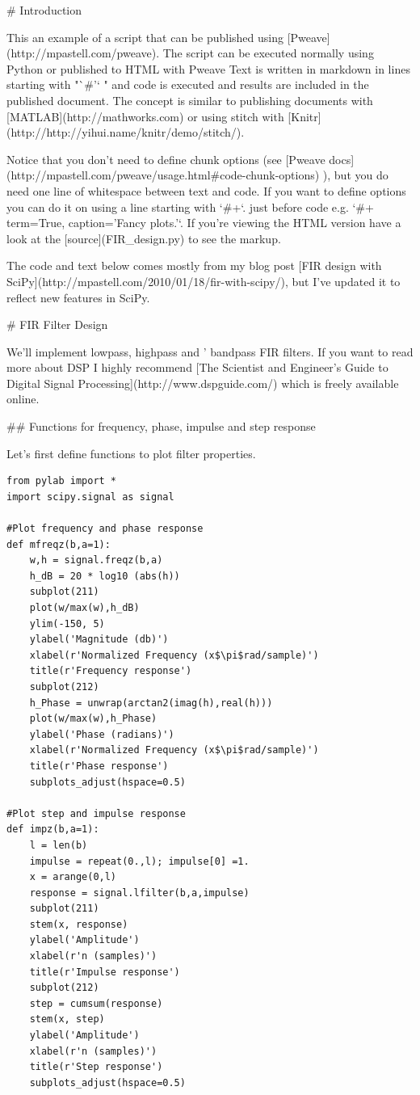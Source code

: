 
# Introduction

This an example of a script that can be published using
[Pweave](http://mpastell.com/pweave). The script can be executed
normally using Python or published to HTML with Pweave
Text is written in markdown in lines starting with "`#'` " and code
is executed and results are included in the published document.
The concept is similar to
publishing documents with [MATLAB](http://mathworks.com) or using
stitch with [Knitr](http://http://yihui.name/knitr/demo/stitch/).

Notice that you don't need to define chunk options (see
[Pweave docs](http://mpastell.com/pweave/usage.html#code-chunk-options)
),
but you do need one line of whitespace between text and code.
If you want to define options you can do it on using a line starting with
`#+`. just before code e.g. `#+ term=True, caption='Fancy plots.'`. 
If you're viewing the HTML version have a look at the
[source](FIR_design.py) to see the markup.

The code and text below comes mostly
from my blog post [FIR design with SciPy](http://mpastell.com/2010/01/18/fir-with-scipy/),
but I've updated it to reflect new features in SciPy. 

# FIR Filter Design

We'll implement lowpass, highpass and ' bandpass FIR filters. If
you want to read more about DSP I highly recommend [The Scientist
and Engineer's Guide to Digital Signal
Processing](http://www.dspguide.com/) which is freely available
online.

## Functions for frequency, phase, impulse and step response

Let's first define functions to plot filter
properties.



\begin{verbatim}
from pylab import *
import scipy.signal as signal

#Plot frequency and phase response
def mfreqz(b,a=1):
    w,h = signal.freqz(b,a)
    h_dB = 20 * log10 (abs(h))
    subplot(211)
    plot(w/max(w),h_dB)
    ylim(-150, 5)
    ylabel('Magnitude (db)')
    xlabel(r'Normalized Frequency (x$\pi$rad/sample)')
    title(r'Frequency response')
    subplot(212)
    h_Phase = unwrap(arctan2(imag(h),real(h)))
    plot(w/max(w),h_Phase)
    ylabel('Phase (radians)')
    xlabel(r'Normalized Frequency (x$\pi$rad/sample)')
    title(r'Phase response')
    subplots_adjust(hspace=0.5)

#Plot step and impulse response
def impz(b,a=1):
    l = len(b)
    impulse = repeat(0.,l); impulse[0] =1.
    x = arange(0,l)
    response = signal.lfilter(b,a,impulse)
    subplot(211)
    stem(x, response)
    ylabel('Amplitude')
    xlabel(r'n (samples)')
    title(r'Impulse response')
    subplot(212)
    step = cumsum(response)
    stem(x, step)
    ylabel('Amplitude')
    xlabel(r'n (samples)')
    title(r'Step response')
    subplots_adjust(hspace=0.5)
\end{verbatim}


